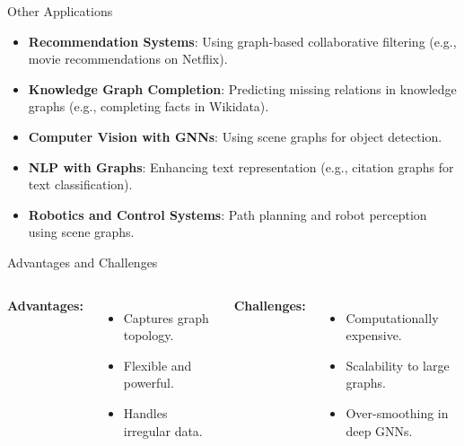 \documentclass{beamer}
\begin{document}
\begin{frame}{Other Applications}
    \begin{itemize}
        \item \textbf{Recommendation Systems}: Using graph-based collaborative filtering (e.g., movie recommendations on Netflix).
        \item \textbf{Knowledge Graph Completion}: Predicting missing relations in knowledge graphs (e.g., completing facts in Wikidata).
        \item \textbf{Computer Vision with GNNs}: Using scene graphs for object detection.
        \item \textbf{NLP with Graphs}: Enhancing text representation (e.g., citation graphs for text classification).
        \item \textbf{Robotics and Control Systems}: Path planning and robot perception using scene graphs.
    \end{itemize}
\end{frame}

\begin{frame}{Advantages and Challenges}
    \begin{columns}
        \textbf{Advantages:}
        \begin{itemize}
            \item Captures graph topology.
            \item Flexible and powerful.
            \item Handles irregular data.
        \end{itemize}

        \textbf{Challenges:}
        \begin{itemize}
            \item Computationally expensive.
            \item Scalability to large graphs.
            \item Over-smoothing in deep GNNs.
        \end{itemize}
    \end{columns}
\end{frame}


\end{document}
